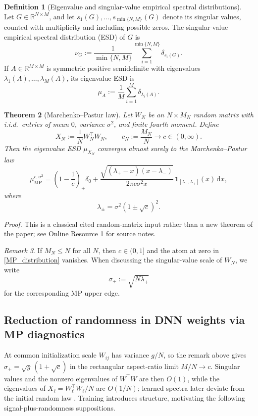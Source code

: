 \documentclass[11pt]{article}
\theoremstyle{plain}
\newtheorem{thm}{Theorem}[section]
\theoremstyle{definition}
\newtheorem{defn}[thm]{Definition}
\theoremstyle{remark}
\newtheorem{rem}[thm]{Remark}
\newcommand{\R}{\mathbb{R}}
\newcommand{\1}{\mathbf{1}}
\newcommand{\di}{\mathrm{d}}
\newcommand{\proofloc}[1]{\par\noindent\emph{Proof.} #1\par}
\begin{document}
\begin{defn}[Eigenvalue and singular-value empirical spectral distributions]
\label{ESD_Definition}
Let \(G\in\R^{N\times M}\), and let \(s_1(G),\dots,s_{\min\{N,M\}}(G)\) denote its singular values, counted with multiplicity and including possible zeros. The singular-value empirical spectral distribution (ESD) of \(G\) is
\[
\nu_G:=\frac{1}{\min\{N,M\}}\sum_{i=1}^{\min\{N,M\}}\delta_{s_i(G)}.
\]
If \(A\in\R^{M\times M}\) is symmetric positive semidefinite with eigenvalues \(\lambda_1(A),\dots,\lambda_M(A)\), its eigenvalue ESD is
\[
\mu_A:=\frac{1}{M}\sum_{i=1}^M \delta_{\lambda_i(A)}.
\]
\end{defn}

\begin{thm}[Marchenko--Pastur law]
\label{RMT_MP_theorem}
Let \(W_N\) be an \(N\times M_N\) random matrix with i.i.d.\ entries of mean \(0\), variance \(\sigma^2\), and finite fourth moment. Define
\[
X_N:=\frac{1}{N}W_N^\top W_N,
\qquad c_N:=\frac{M_N}{N}\to c\in(0,\infty).
\]
Then the eigenvalue ESD \(\mu_{X_N}\) converges almost surely to the Marchenko--Pastur law
\begin{equation}
\label{MP_distribution}
\mu_{\mathrm{MP}}^{c,\sigma^2}
=
\left(1-\frac{1}{c}\right)_+\delta_0
+
\frac{\sqrt{(\lambda_+-x)(x-\lambda_-)}}{2\pi c\sigma^2 x}\,
\1_{[\lambda_-,\lambda_+]}(x)\,\di x,
\end{equation}
where
\begin{equation}
\label{lambda_parameters}
\lambda_\pm=\sigma^2(1\pm \sqrt c)^2.
\end{equation}
\end{thm}
\proofloc{This is a classical cited random-matrix input rather than a new theorem of the paper; see Online Resource 1 for source notes.}

\begin{rem}
If \(M_N\le N\) for all \(N\), then \(c\in(0,1]\) and the atom at zero in \eqref{MP_distribution} vanishes. When discussing the singular-value scale of \(W_N\), we write
\[
\sigma_+ := \sqrt{N\lambda_+}
\]
for the corresponding MP upper edge.
\end{rem}

\subsection{Reduction of randomness in DNN weights via MP diagnostics}
\label{overallpicture}

At common initialization scale \(W_{ij}\) has variance \(g/N\), so the remark above gives \(\sigma_+=\sqrt g\,(1+\sqrt c)\) in the rectangular aspect-ratio limit \(M/N\to c\). Singular values and the nonzero eigenvalues of \(W^\top W\) are then \(O(1)\), while the eigenvalues of \(X_\ell=W_\ell^\top W_\ell/N\) are \(O(1/N)\); learned spectra later deviate from the initial random law \cite{martin2021implicit,staats2022boundary}. Training introduces structure, motivating the following signal-plus-randomness suppositions.
\end{document}
